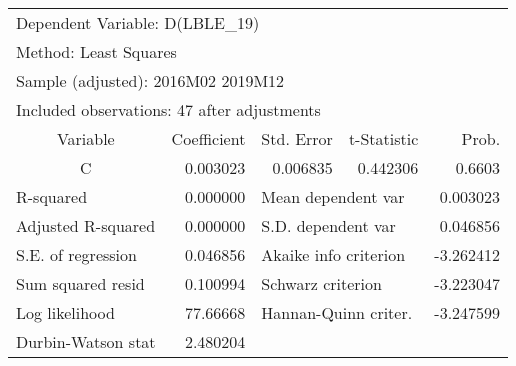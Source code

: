 \begin{tabular}{lrrrr}
\toprule
\multicolumn{3}{l}{Dependent Variable: D(LBLE\_19)}&\multicolumn{1}{c}{}&\multicolumn{1}{c}{}\\
\multicolumn{2}{l}{Method: Least Squares}&\multicolumn{1}{c}{}&\multicolumn{1}{c}{}&\multicolumn{1}{c}{}\\
\multicolumn{3}{l}{Sample (adjusted): 2016M02 2019M12}&\multicolumn{1}{c}{}&\multicolumn{1}{c}{}\\
\multicolumn{4}{l}{Included observations: 47 after adjustments}&\multicolumn{1}{c}{}\\
\midrule
\multicolumn{1}{c}{Variable}&\multicolumn{1}{r}{Coefficient}&\multicolumn{1}{r}{Std. Error}&\multicolumn{1}{r}{t-Statistic}&\multicolumn{1}{r}{Prob.}\\
\midrule
\multicolumn{1}{c}{C}&\multicolumn{1}{r}{0.003023}&\multicolumn{1}{r}{0.006835}&\multicolumn{1}{r}{0.442306}&\multicolumn{1}{r}{0.6603}\\
\midrule
\multicolumn{1}{l}{R-squared}&\multicolumn{1}{r}{0.000000}&\multicolumn{2}{l}{Mean dependent var}&\multicolumn{1}{r}{0.003023}\\
\multicolumn{1}{l}{Adjusted R-squared}&\multicolumn{1}{r}{0.000000}&\multicolumn{2}{l}{S.D. dependent var}&\multicolumn{1}{r}{0.046856}\\
\multicolumn{1}{l}{S.E. of regression}&\multicolumn{1}{r}{0.046856}&\multicolumn{2}{l}{Akaike info criterion}&\multicolumn{1}{r}{-3.262412}\\
\multicolumn{1}{l}{Sum squared resid}&\multicolumn{1}{r}{0.100994}&\multicolumn{2}{l}{Schwarz criterion}&\multicolumn{1}{r}{-3.223047}\\
\multicolumn{1}{l}{Log likelihood}&\multicolumn{1}{r}{77.66668}&\multicolumn{2}{l}{Hannan-Quinn criter.}&\multicolumn{1}{r}{-3.247599}\\
\multicolumn{1}{l}{Durbin-Watson stat}&\multicolumn{1}{r}{2.480204}&\multicolumn{1}{c}{}&\multicolumn{1}{c}{}&\multicolumn{1}{c}{}\\
\bottomrule
\end{tabular}